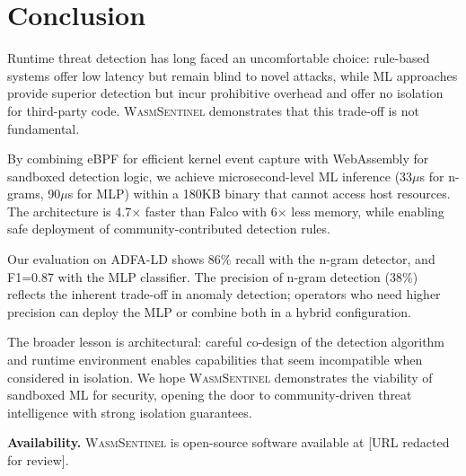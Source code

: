 
\section{Conclusion}
\label{sec:conclusion}

Runtime threat detection has long faced an uncomfortable choice: rule-based systems offer low latency but remain blind to novel attacks, while ML approaches provide superior detection but incur prohibitive overhead and offer no isolation for third-party code.
\textsc{WasmSentinel} demonstrates that this trade-off is not fundamental.

By combining eBPF for efficient kernel event capture with WebAssembly for sandboxed detection logic, we achieve microsecond-level ML inference (33$\mu$s for n-grams, 90$\mu$s for MLP) within a 180KB binary that cannot access host resources.
The architecture is 4.7$\times$ faster than Falco with 6$\times$ less memory, while enabling safe deployment of community-contributed detection rules.

Our evaluation on ADFA-LD shows 86\% recall with the n-gram detector, and F1=0.87 with the MLP classifier.
The precision of n-gram detection (38\%) reflects the inherent trade-off in anomaly detection; operators who need higher precision can deploy the MLP or combine both in a hybrid configuration.

The broader lesson is architectural: careful co-design of the detection algorithm and runtime environment enables capabilities that seem incompatible when considered in isolation.
We hope \textsc{WasmSentinel} demonstrates the viability of sandboxed ML for security, opening the door to community-driven threat intelligence with strong isolation guarantees.

\textbf{Availability.}
\textsc{WasmSentinel} is open-source software available at [URL redacted for review].

